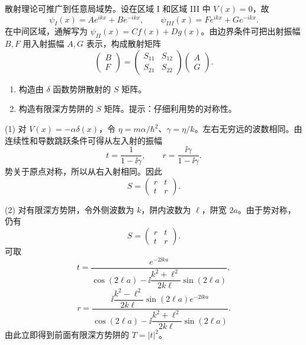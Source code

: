\begin{question}
散射理论可推广到任意局域势。设在区域 I 和区域 III 中 $V(x)=0$，故
\[
\psi_I(x)=Ae^{ikx}+Be^{-ikx},\qquad
\psi_{III}(x)=Fe^{ikx}+Ge^{-ikx}.
\]
在中间区域，通解写为 $\psi_{II}(x)=Cf(x)+Dg(x)$。由边界条件可把出射振幅 $B,F$ 用入射振幅 $A,G$ 表示，构成散射矩阵
\[
\begin{pmatrix}B\\F\end{pmatrix}=\begin{pmatrix}S_{11}&S_{12}\\S_{21}&S_{22}\end{pmatrix}
\begin{pmatrix}A\\G\end{pmatrix}.
\]
\begin{enumerate}
\item 构造由 $\delta$ 函数势阱散射的 $S$ 矩阵。
\item 构造有限深方势阱的 $S$ 矩阵。提示：仔细利用势的对称性。
\end{enumerate}
\end{question}
\begin{solution}
(1) 对 $V(x)=-\alpha\delta(x)$，令 $\eta=m\alpha/\hbar^2$、$\gamma=\eta/k$。左右无穷远的波数相同。由连续性和导数跳跃条件可得从左入射的振幅
\[
t=\frac1{1-\ii\gamma},
\qquad
r=\frac{\ii\gamma}{1-\ii\gamma}.
\]
势关于原点对称，所以从右入射相同。因此
\[
S=\begin{pmatrix}r&t\\t&r\end{pmatrix}.
\]

(2) 对有限深方势阱，令外侧波数为 $k$，阱内波数为 $\ell$，阱宽 $2a$。由于势对称，仍有
\[
S=\begin{pmatrix}r&t\\t&r\end{pmatrix}.
\]
可取
\[
t=\frac{e^{-2\ii ka}}{\cos(2\ell a)-\ii\dfrac{k^2+\ell^2}{2k\ell}\sin(2\ell a)},
\]
\[
r=\frac{\ii\dfrac{k^2-\ell^2}{2k\ell}\sin(2\ell a)e^{-2\ii ka}}
{\cos(2\ell a)-\ii\dfrac{k^2+\ell^2}{2k\ell}\sin(2\ell a)}.
\]
由此立即得到前面有限深方势阱的 $T=|t|^2$。
\end{solution}

